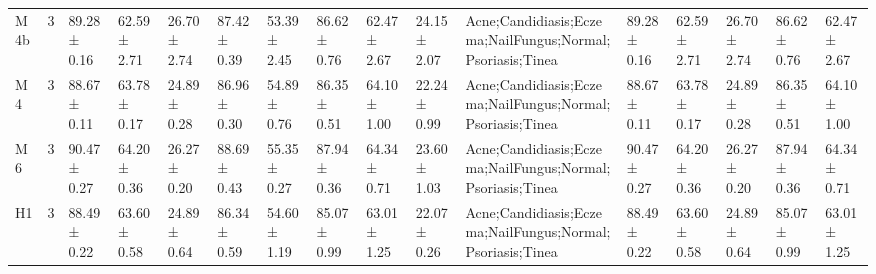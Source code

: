 \begin{tabular}{lrllllllllllllll}
M4b & 3 & 89.28 ± 0.16 & 62.59 ± 2.71 & 26.70 ± 2.74 & 87.42 ± 0.39 & 53.39 ± 2.45 & 86.62 ± 0.76 & 62.47 ± 2.67 & 24.15 ± 2.07 & Acne;Candidiasis;Eczema;NailFungus;Normal;Psoriasis;Tinea & 89.28 ± 0.16 & 62.59 ± 2.71 & 26.70 ± 2.74 & 86.62 ± 0.76 & 62.47 ± 2.67 \\
M4 & 3 & 88.67 ± 0.11 & 63.78 ± 0.17 & 24.89 ± 0.28 & 86.96 ± 0.30 & 54.89 ± 0.76 & 86.35 ± 0.51 & 64.10 ± 1.00 & 22.24 ± 0.99 & Acne;Candidiasis;Eczema;NailFungus;Normal;Psoriasis;Tinea & 88.67 ± 0.11 & 63.78 ± 0.17 & 24.89 ± 0.28 & 86.35 ± 0.51 & 64.10 ± 1.00 \\
M6 & 3 & 90.47 ± 0.27 & 64.20 ± 0.36 & 26.27 ± 0.20 & 88.69 ± 0.43 & 55.35 ± 0.27 & 87.94 ± 0.36 & 64.34 ± 0.71 & 23.60 ± 1.03 & Acne;Candidiasis;Eczema;NailFungus;Normal;Psoriasis;Tinea & 90.47 ± 0.27 & 64.20 ± 0.36 & 26.27 ± 0.20 & 87.94 ± 0.36 & 64.34 ± 0.71 \\
H1 & 3 & 88.49 ± 0.22 & 63.60 ± 0.58 & 24.89 ± 0.64 & 86.34 ± 0.59 & 54.60 ± 1.19 & 85.07 ± 0.99 & 63.01 ± 1.25 & 22.07 ± 0.26 & Acne;Candidiasis;Eczema;NailFungus;Normal;Psoriasis;Tinea & 88.49 ± 0.22 & 63.60 ± 0.58 & 24.89 ± 0.64 & 85.07 ± 0.99 & 63.01 ± 1.25 \\
\bottomrule
\end{tabular}
